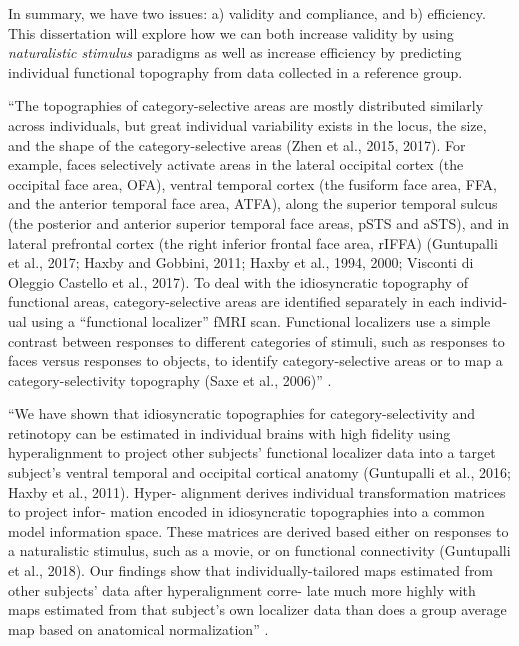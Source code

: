In summary, we have two issues: a) validity and compliance, and b) efficiency.
This dissertation will explore how we can both increase validity by using
\textit{naturalistic stimulus} paradigms as well as increase efficiency by
predicting individual functional topography from data collected in a reference
group.

``The topographies of category-selective areas are mostly distributed similarly
across individuals, but great individual variability exists in the locus, the
size, and the shape of the category-selective areas (Zhen et al., 2015, 2017).
For example, faces selectively activate areas in the lateral occipital cortex
(the occipital face area, OFA), ventral temporal cortex (the fusiform face area,
FFA, and the anterior temporal face area, ATFA), along the superior temporal
sulcus (the posterior and anterior superior temporal face areas, pSTS and aSTS),
and in lateral prefrontal cortex (the right inferior frontal face area, rIFFA)
(Guntupalli et al., 2017; Haxby and Gobbini, 2011; Haxby et al., 1994, 2000;
Visconti di Oleggio Castello et al., 2017). To deal with the idiosyncratic
topography of functional areas, category-selective areas are identiﬁed
separately in each individ- ual using a “functional localizer” fMRI scan.
Functional localizers use a simple contrast between responses to different
categories of stimuli, such as responses to faces versus responses to objects,
to identify category-selective areas or to map a category-selectivity topography
(Saxe et al., 2006)'' \citep{jiahui2020predicting}.

``We have shown that idiosyncratic topographies for category-selectivity and
retinotopy can be estimated in individual brains with high ﬁdelity using
hyperalignment to project other subjects’ functional localizer data into a
target subject’s ventral temporal and occipital cortical anatomy (Guntupalli et
al., 2016; Haxby et al., 2011). Hyper- alignment derives individual
transformation matrices to project infor- mation encoded in idiosyncratic
topographies into a common model information space. These matrices are derived
based either on responses to a naturalistic stimulus, such as a movie, or on
functional connectivity (Guntupalli et al., 2018). Our ﬁndings show that
individually-tailored maps estimated from other subjects’ data after
hyperalignment corre- late much more highly with maps estimated from that
subject’s own localizer data than does a group average map based on anatomical
normalization'' \citep{jiahui2020predicting}.

